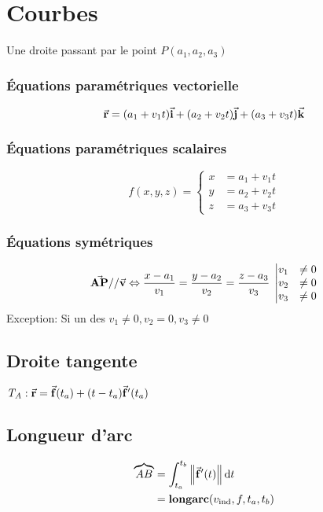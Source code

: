 \section{Courbes}
Une droite passant par le point $P(a_1,a_2,a_3)$
\subsubsection{Équations paramétriques vectorielle}
\begin{equation*}
    \va{r} = (a_1 + v_1 t)\va{i}+(a_2 + v_2 t)\va{j} +(a_3 + v_3 t)\va{k}
\end{equation*}

\subsubsection{Équations paramétriques scalaires}
    \begin{equation*} 
        f(x,y,z) = \left\{ 
            \begin{matrix}
            x &= a_1 + v_1 t\\
            y &= a_2 + v_2 t\\
            z &= a_3 + v_3 t
        \end{matrix}
        \right.
    \end{equation*}
    
\subsubsection{Équations symétriques}
    \begin{equation*}
       \va{AP} // \va{v} \Leftrightarrow \frac{x-a_1}{v_1} = \frac{y-a_2}{v_2} = \frac{z-a_3}{v_3} \; \left| \begin{matrix} v_1 &\neq 0\\ v_2 &\neq 0\\ v_3 &\neq 0 \end{matrix} \right.
    \end{equation*}
    Exception: Si un des $v_1\neq0, v_2 = 0, v_3 \neq 0$

\subsection{Droite tangente}
\( \mathit{T_A} : \va{r}= \va{f}(t_a)+(t-t_a)\va{f}^\prime(t_a) \)

\subsection{Longueur d'arc}
\begin{align*}
    \overbrace{AB} &= \int^{t_b}_{t_a}\norm{\va{f}^\prime(t)}\dd{t}\\
     &= \mathbf{longarc}(v_{\mathrm{ind}},f,t_a,t_b)
\end{align*}

